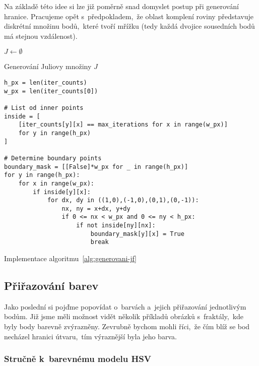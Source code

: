 Na základě této idee si lze již poměrně snad domyslet postup při generování hranice. Pracujeme opět s~předpokladem,~že oblast komplení roviny představuje diskrétní množinu bodů,~které tvoří mřížku (tedy každá dvojice sousedních bodů má stejnou vzdálenost). 
\begin{algorithm}[h]
    $J\gets\emptyset$\;
    \;
    \caption{Generování Juliovy množiny $J$}
    \label{alg:generovani-jf}
\end{algorithm}
\begin{program}
\begin{lstlisting}[style=python]
h_px = len(iter_counts)
w_px = len(iter_counts[0])

# List od inner points
inside = [
    [iter_counts[y][x] == max_iterations for x in range(w_px)]
    for y in range(h_px)
]

# Determine boundary points
boundary_mask = [[False]*w_px for _ in range(h_px)]
for y in range(h_px):
    for x in range(w_px):
        if inside[y][x]:
            for dx, dy in ((1,0),(-1,0),(0,1),(0,-1)):
                nx, ny = x+dx, y+dy
                if 0 <= nx < w_px and 0 <= ny < h_px:
                    if not inside[ny][nx]:
                        boundary_mask[y][x] = True
                        break
\end{lstlisting}
    \caption{Implementace algoritmu~\ref{alg:generovani-jf}}
    \label{prog:generovani-jf}
\end{program}

\subsection{Přiřazování barev}\label{subsec:prirazovani-barev}

Jako poslední si pojďme popovídat o~barvách a~jejich přiřazování jednotlivým bodům. Již jsme měli možnost vidět několik příkladů obrázků s~fraktály,~kde byly body barevně zvýrazněny. Zevrubně bychom mohli říci,~že čím blíž se bod necházel hranici útvaru,~tím výraznější byla jeho barva.

\subsubsection{Stručně k~barevnému modelu HSV}

